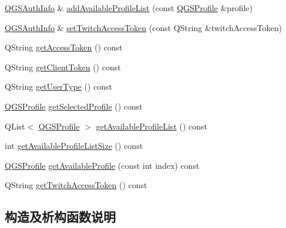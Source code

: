 \begin{DoxyCompactItemize}
\item 
\mbox{\hyperlink{class_q_g_s_auth_info}{Q\+G\+S\+Auth\+Info}} \& \mbox{\hyperlink{class_q_g_s_auth_info_afb0d793a2d7012e941a76de47d43da0b}{add\+Available\+Profile\+List}} (const \mbox{\hyperlink{class_q_g_s_auth_info_1_1_q_g_s_profile}{Q\+G\+S\+Profile}} \&profile)
\item 
\mbox{\hyperlink{class_q_g_s_auth_info}{Q\+G\+S\+Auth\+Info}} \& \mbox{\hyperlink{class_q_g_s_auth_info_aaaaf3569cd3e9beb667ceaa52478dcab}{set\+Twitch\+Access\+Token}} (const Q\+String \&twitch\+Access\+Token)
\item 
Q\+String \mbox{\hyperlink{class_q_g_s_auth_info_a32fa6ea3903aa1709fe251cf21c4ef1d}{get\+Access\+Token}} () const
\item 
Q\+String \mbox{\hyperlink{class_q_g_s_auth_info_a39265ef2f709e1ab11e8bed1d6f18a18}{get\+Client\+Token}} () const
\item 
Q\+String \mbox{\hyperlink{class_q_g_s_auth_info_a74584eceedefa53603e49b2ef2cca18f}{get\+User\+Type}} () const
\item 
\mbox{\hyperlink{class_q_g_s_auth_info_1_1_q_g_s_profile}{Q\+G\+S\+Profile}} \mbox{\hyperlink{class_q_g_s_auth_info_ac8fcc26305980bda0c99a5d7a03c6f90}{get\+Selected\+Profile}} () const
\item 
Q\+List$<$ \mbox{\hyperlink{class_q_g_s_auth_info_1_1_q_g_s_profile}{Q\+G\+S\+Profile}} $>$ \mbox{\hyperlink{class_q_g_s_auth_info_a6cceb71cd4c794668bc4670fe2fe1a0e}{get\+Available\+Profile\+List}} () const
\item 
int \mbox{\hyperlink{class_q_g_s_auth_info_a38241e93cc9c324f8dd31b7ca8c1612e}{get\+Available\+Profile\+List\+Size}} () const
\item 
\mbox{\hyperlink{class_q_g_s_auth_info_1_1_q_g_s_profile}{Q\+G\+S\+Profile}} \mbox{\hyperlink{class_q_g_s_auth_info_ab1132aa84ab91918f0c919846193b8a8}{get\+Available\+Profile}} (const int index) const
\item 
Q\+String \mbox{\hyperlink{class_q_g_s_auth_info_abfb4440c71e2b0eb36039a5fd27041f4}{get\+Twitch\+Access\+Token}} () const
\end{DoxyCompactItemize}


\subsection{构造及析构函数说明}
\mbox{\label{class_q_g_s_auth_info_a4c8bba8663da517cb1247ee7875fbce5}} 
